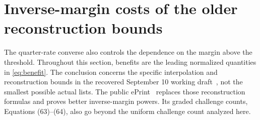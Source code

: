 \section{Inverse-margin costs of the older reconstruction bounds}
\label{sec:gap-costs}

The quarter-rate converse also controls the dependence on the margin
above the threshold. Throughout this section, benefits are the leading
normalized quantities in \eqref{eq:benefit}. The conclusion concerns the
specific interpolation and reconstruction bounds in the recovered
September 10 working draft~\cite{DKT}, not the smallest possible actual
lists. The public ePrint~\cite{DKTcurrent} replaces those reconstruction
formulas and proves better inverse-margin powers. Its graded challenge
counts, Equations (63)--(64), also go beyond the uniform challenge count
analyzed here.

